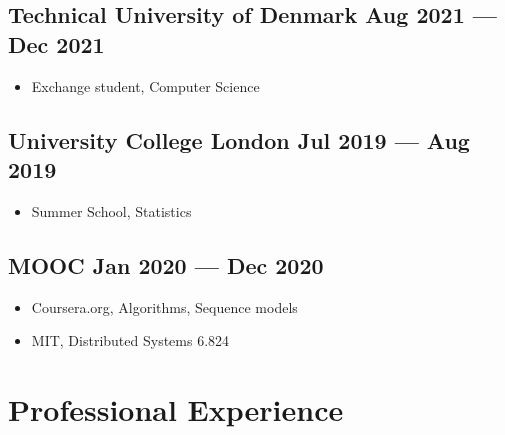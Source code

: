 \documentclass[a4,12pt]{article}
\newcommand{\subtext}[1]{
#1\par\vspace{-0.3cm}}
\newenvironment{zitemize}{
\begin{itemize}\itemsep0pt \parskip0pt \parsep1pt}
{\end{itemize}\vspace{-0.5cm}}
\begin{document}
\subsection*{Technical University of Denmark \hfill \textbf{Aug 2021 --- Dec 2021}}
\begin{zitemize}
    \item
        \subtext{Exchange student, Computer Science}
        \vspace{0.15cm}
\end{zitemize}

\subsection*{University College London \hfill \textbf{Jul 2019 --- Aug 2019}}
\begin{zitemize}
    \item
        \subtext{Summer School, Statistics}
        \vspace{0.15cm}
\end{zitemize}

\subsection*{MOOC \hfill \textbf{Jan 2020 --- Dec 2020}}
\begin{zitemize}
    \item
        \subtext{Coursera.org, Algorithms, Sequence models }
        \vspace{0.15cm}
    \item
        \subtext{MIT, Distributed Systems 6.824}
        \vspace{0.15cm}
\end{zitemize}
\vspace{0.2cm}





\section{\textbf{Professional Experience}}

        
\end{document}

